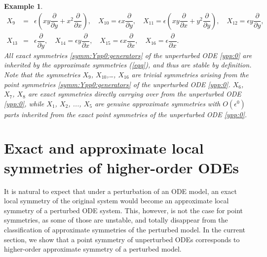 \documentclass[11pt,letter,subeqn]{article}
\newtheorem{example}{Example}[section]
\begin{document}
\begin{example}
\begin{eqnarray}
       \nonumber
      X_9&=& \epsilon \left( xy\dfrac{\partial}{\partial y}+x^2 \dfrac{\partial}{\partial x}\right),\quad X_{10}=\epsilon
      x\dfrac{\partial}{\partial y},\quad X_{11}=\epsilon \left(xy\dfrac{\partial}{\partial x}+y^2\dfrac{\partial}{\partial y}\right),\quad X_{12}= \epsilon y \dfrac{\partial}{\partial y},\\
      X_{13}&=& \epsilon  \dfrac{\partial}{\partial y},\quad X_{14}=\epsilon y\dfrac{\partial}{\partial x},\quad
       X_{15}=\epsilon x\dfrac{\partial}{\partial x},\quad X_{16}=\epsilon \dfrac{\partial}{\partial x}.
    \end{eqnarray}
    All exact symmetries \eqref{symm:Ypp0:generators} of the unperturbed ODE \eqref{ypp:0} are inherited by the approximate symmetries (\ref{eqq}), and thus are {\textrm{stable}} by definition. Note that the symmetries $X_9$, $X_{10}$,\ldots, $X_{16}$ are trivial symmetries arising from the point symmetries \eqref{symm:Ypp0:generators} of the unperturbed ODE \eqref{ypp:0}. $X_6$, $X_7$, $X_8$ are exact symmetries directly carrying over from the unperturbed ODE \eqref{ypp:0}, while $X_1$, $X_2$, ..., $X_5$ are genuine approximate symmetries with $O(\epsilon^0)$ parts inherited from the exact point symmetries of the unperturbed ODE \eqref{ypp:0}.
     \end{example}



\section{Exact and approximate local symmetries of higher-order ODEs}\label{sec:localsym}
     It is natural to expect that under a perturbation of an ODE model, an exact local symmetry of the original system would become an approximate local symmetry of a perturbed ODE system. This, however, is not the case for point symmetries, as some of those are {\textrm{unstable}}, and totally disappear from the classification of approximate symmetries of the perturbed model.  In the current section, we show that a point symmetry of unperturbed ODEs corresponds to higher-order approximate symmetry of a perturbed model.
\end{document}
